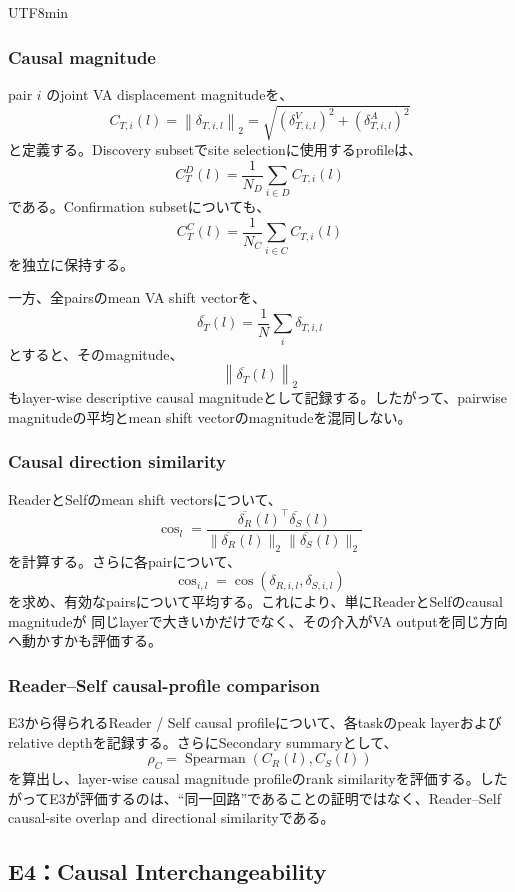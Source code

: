 \documentclass{article} %
\begin{document}
\begin{CJK*}{UTF8}{min}
\subsubsection{Causal magnitude}
pair \(i\) のjoint VA displacement magnitudeを、
\[
C_{T,i}(l)
=
\left\|
\delta_{T,i,l}
\right\|_2
=
\sqrt{
(\delta^V_{T,i,l})^2
+
(\delta^A_{T,i,l})^2
}
\]
と定義する。Discovery subsetでsite selectionに使用するprofileは、
\[
C_T^{D}(l)
=
\frac{1}{N_D}
\sum_{i\in D}
C_{T,i}(l)
\]
である。Confirmation subsetについても、
\[
C_T^{C}(l)
=
\frac{1}{N_C}
\sum_{i\in C}
C_{T,i}(l)
\]
を独立に保持する。

一方、全pairsのmean VA shift vectorを、
\[
\overline{\delta_T}(l)
=
\frac{1}{N}
\sum_i
\delta_{T,i,l}
\]
とすると、そのmagnitude、
\[
\left\|
\overline{\delta_T}(l)
\right\|_2
\]
もlayer-wise descriptive causal magnitudeとして記録する。したがって、pairwise magnitudeの平均とmean shift vectorのmagnitudeを混同しない。


\subsubsection{Causal direction similarity}
ReaderとSelfのmean shift vectorsについて、
\[
\cos_l
=
\frac{
\overline{\delta_R}(l)^\top
\overline{\delta_S}(l)
}{
\|
\overline{\delta_R}(l)
\|_2
\|
\overline{\delta_S}(l)
\|_2
}
\]
を計算する。さらに各pairについて、
\[
\cos_{i,l}
=
\cos
(
\delta_{R,i,l},
\delta_{S,i,l}
)
\]
を求め、有効なpairsについて平均する。これにより、単にReaderとSelfのcausal magnitudeが
同じlayerで大きいかだけでなく、その介入がVA outputを同じ方向へ動かすかも評価する。


\subsubsection{Reader--Self causal-profile comparison}

E3から得られるReader / Self causal profileについて、各taskのpeak layerおよびrelative depthを記録する。さらにSecondary summaryとして、
\[
\rho_C
=
\operatorname{Spearman}
(
C_R(l),
C_S(l)
)
\]
を算出し、layer-wise causal magnitude profileのrank similarityを評価する。したがってE3が評価するのは、``同一回路''であることの証明ではなく、Reader--Self causal-site overlap and directional similarityである。


\subsection{E4：Causal Interchangeability}
\label{app:v1-e4}


\end{CJK*}
\end{document}

